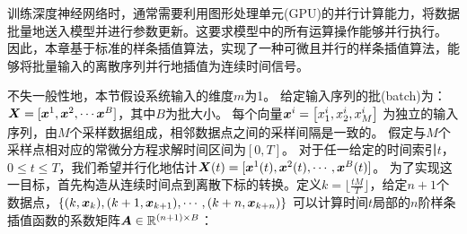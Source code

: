 训练深度神经网络时，通常需要利用图形处理单元(GPU)的并行计算能力，将数据批量地送入模型并进行参数更新。这要求模型中的所有运算操作能够并行执行。
因此，本章基于标准的样条插值算法，实现了一种可微且并行的样条插值算法，能够将批量输入的离散序列并行地插值为连续时间信号。

不失一般性地，本节假设系统输入的维度$m$为1。
给定输入序列的批(batch)为：
$\boldsymbol X = [\boldsymbol x ^1, \boldsymbol x ^2,\cdots\boldsymbol x^B]$，其中$B$为批大小。
每个向量$\boldsymbol x^i=\left[x_1^i, x_2^i, x_M ^i\right]$
为独立的输入序列，由$M$个采样数据组成，相邻数据点之间的采样间隔是一致的。
假定与$M$个采样点相对应的常微分方程求解时间区间为$[0,T]$。
对于任一给定的时间索引$t$，$0\leq t \leq T$，我们希望并行化地估计$\boldsymbol X(t) = [\boldsymbol x ^1(t),\boldsymbol x ^2(t),\cdots,\boldsymbol x^B(t)]$。
为了实现这一目标，首先构造从连续时间点到离散下标的转换。定义$k=\lfloor \frac{tM}{T} \rfloor$，给定$n+1$个数据点，$\{(k, \boldsymbol x_k),(k+1, \boldsymbol x_{k+1}),\cdots,(k+n, \boldsymbol x_{k+n})\}$
可以计算时间$t$局部的$n$阶样条插值函数的系数矩阵$\boldsymbol A\in\mathbb{R}^{(n+1)\times B}$：

